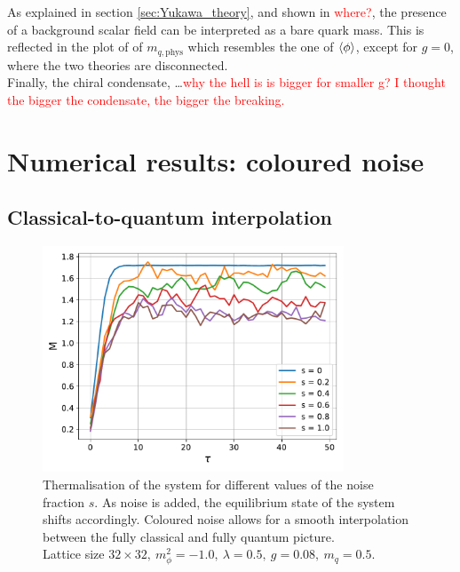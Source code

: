 As explained in section \ref{sec:Yukawa_theory}, and shown in \textcolor{red}{where?}, the presence of a background scalar field can be interpreted as a bare quark mass. This is reflected in the plot of of $m_{q, \text{phys}}$ which resembles the one of $\left\langle \phi \right\rangle$, except for $g=0$, where the two theories are disconnected. \\
Finally, the chiral condensate, \dots \textcolor{red}{why the hell is is bigger for smaller g? I thought the bigger the condensate, the bigger the breaking.}
\chapter{Numerical results: coloured noise}
\label{chapt:results_coloured}

\section{Classical-to-quantum interpolation}

\label{sec:classical_to_quantum}

\begin{figure}[h]
    \centering
    \includegraphics[width=0.8\textwidth]{figures/slide_broken/thermalisation.pdf}
    \caption[Thermalisation of the system for different values of the noise fraction $s$.]{Thermalisation of the system for different values of the noise fraction $s$. As noise is added, the equilibrium state of the system shifts accordingly. Coloured noise allows for a smooth interpolation between the fully classical and fully quantum picture.\\ Lattice size $32 \times 32, \ m_\phi^2=-1.0, \ \lambda=0.5, \ g=0.08, \ m_q = 0.5$.}
    \label{fig:thermalisation_different_noise_fracs}
\end{figure}

